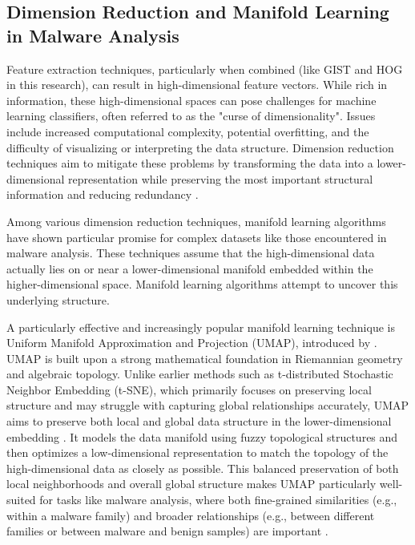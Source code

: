 \subsection{Dimension Reduction and Manifold Learning in Malware Analysis}
\label{subsec:dim_reduction}

Feature extraction techniques, particularly when combined (like GIST and HOG in this research), can result in high-dimensional feature vectors. While rich in information, these high-dimensional spaces can pose challenges for machine learning classifiers, often referred to as the "curse of dimensionality". Issues include increased computational complexity, potential overfitting, and the difficulty of visualizing or interpreting the data structure. Dimension reduction techniques aim to mitigate these problems by transforming the data into a lower-dimensional representation while preserving the most important structural information and reducing redundancy \citep{mcinnes2018umap}.

Among various dimension reduction techniques, manifold learning algorithms have shown particular promise for complex datasets like those encountered in malware analysis. These techniques assume that the high-dimensional data actually lies on or near a lower-dimensional manifold embedded within the higher-dimensional space. Manifold learning algorithms attempt to uncover this underlying structure.

A particularly effective and increasingly popular manifold learning technique is Uniform Manifold Approximation and Projection (UMAP), introduced by \citet{mcinnes2018umap}. UMAP is built upon a strong mathematical foundation in Riemannian geometry and algebraic topology. Unlike earlier methods such as t-distributed Stochastic Neighbor Embedding (t-SNE), which primarily focuses on preserving local structure and may struggle with capturing global relationships accurately, UMAP aims to preserve both local and global data structure in the lower-dimensional embedding \citep{mcinnes2018umap, becht2019dimensionality}. It models the data manifold using fuzzy topological structures and then optimizes a low-dimensional representation to match the topology of the high-dimensional data as closely as possible. This balanced preservation of both local neighborhoods and overall global structure makes UMAP particularly well-suited for tasks like malware analysis, where both fine-grained similarities (e.g., within a malware family) and broader relationships (e.g., between different families or between malware and benign samples) are important \citep{ali2019timeCluster}.

